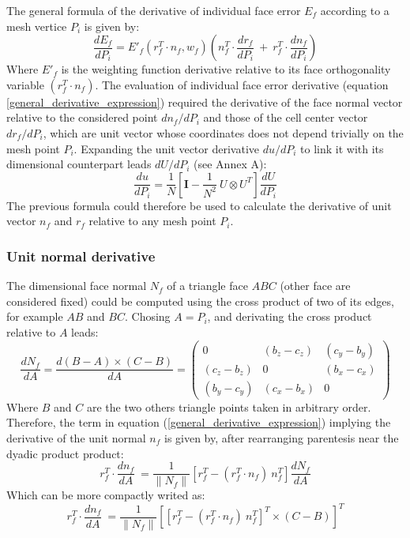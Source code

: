 \documentclass[11pt]{article}
\begin{document}
The general formula of the derivative of individual face error $E_f$ according to a mesh vertice $P_i$ is given by:
%
\begin{equation}
\frac{dE_f}{dP_i} = E'_f\left( r_f^T \cdot n_f, w_f \right) \left(n_f^T \cdot \frac{d r_f}{dP_i}\ +\ r_f^T \cdot \frac{d n_f}{dP_i}\right)
\label{general_derivative_expression}
\end{equation}
%
Where $E'_f$ is the weighting function derivative relative to its face orthogonality variable $(r_f^T \cdot n_f)$.
The evaluation of individual face error derivative (equation \ref{general_derivative_expression}) required the derivative of the face normal vector relative to the considered point $d n_f / dP_i$ and those of the cell center vector $d r_f / dP_i$, which are unit vector whose coordinates does not depend trivially on the mesh point $P_i$.
Expanding the unit vector derivative $du/dP_i$ to link it with its dimensional counterpart leads $dU/dP_i$ (see Annex A):
%
\begin{equation}
\frac{du}{dP_i} = \frac{1}{N} \left[ \boldsymbol{I} - \frac{1}{N^2}\ U \otimes U^T \right] \frac{dU}{dP_i}
\end{equation}
%
The previous formula could therefore be used to calculate the derivative of unit vector $n_f$ and $r_f$ relative to any mesh point $P_i$.

\subsubsection{Unit normal derivative}

The dimensional face normal $N_f$ of a triangle face $ABC$ (other face are considered fixed) could be computed using the cross product of two of its edges, for example $AB$ and $BC$.
Chosing $A = P_i$, and derivating the cross product relative to $A$ leads:
%
\begin{equation}
\frac{d N_f}{dA} = \frac{d (B-A) \times (C-B)}{dA} = \begin{pmatrix}
0 & (b_z-c_z) & (c_y-b_y) \\
(c_z-b_z) & 0 & (b_x-c_x) \\
(b_y-c_y) & (c_x-b_x) & 0
\end{pmatrix} 
\end{equation}
%
Where $B$ and $C$ are the two others triangle points taken in arbitrary order.
Therefore, the term in equation (\ref{general_derivative_expression}) implying the derivative of the unit normal $n_f$ is given by, after rearranging parentesis near the dyadic product product:
\begin{equation}
r_f^T\cdot \frac{d n_f}{dA}\ = 
 \frac{1}{\| N_f \|} \left[ r_f^T -  (r_f^T \cdot n_f)\ n_f^T \right] \frac{d N_f}{dA}
 \label{deriv_n_f}
\end{equation}
%
Which can be more compactly writed as:
%
\begin{equation}
r_f^T\cdot \frac{d n_f}{dA}\ = 
 \frac{1}{\| N_f \|} \left[ \left[ r_f^T -  (r_f^T \cdot n_f)\ n_f^T \right]^T \times (C-B) \right]^T
\end{equation}
\end{document}
